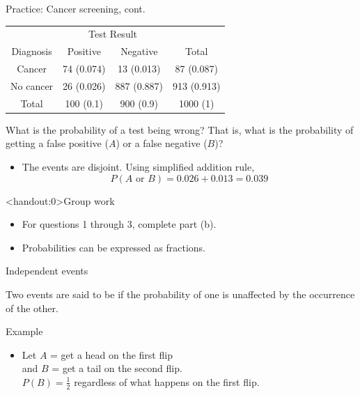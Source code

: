 \documentclass[xcolor=table, handout]{beamer}
\begin{document}
\begin{frame}{Practice: Cancer screening, cont.}
\begin{block}{}
{\centering
\begin{tabular}{c | c  c | c}
\multicolumn{1}{c}{} & \multicolumn{2}{c}{Test Result}\\
Diagnosis & Positive & Negative & Total \\
\hline
Cancer & 74 (0.074) & 13 (0.013) & 87 (0.087)\\
No cancer & 26 (0.026) & 887 (0.887) & 913 (0.913)\\
\hline
Total & 100 (0.1) & 900 (0.9) & 1000 (1)
\end{tabular}\par
}
\end{block}

\begin{exampleblock}{}
What is the probability of a test being wrong? That is, what is the probability of getting a false positive ($A$) or a false negative ($B$)?

\begin{itemize}
\pause
\item The events are disjoint. Using simplified addition rule,
\[ P(A \text{ or } B) = 0.026 + 0.013 = 0.039\]
\end{itemize}
\end{exampleblock}
\end{frame}

\begin{frame}<handout:0>{Group work}
\begin{block}{}
\large
\begin{itemize}
\item For questions 1 through 3, complete part (b).
\item Probabilities can be expressed as fractions.
\end{itemize}
\end{block}
\end{frame}


\begin{frame}{Independent events}
\begin{block}{}
\large Two events are said to be  if the probability of one is unaffected by the occurrence of the other.
\end{block}

\pause

\begin{exampleblock}{Example}
\begin{itemize}
\item Let $A$ = get a head on the first flip\\
and $B$ = get a tail on the second flip.\\
$P(B) = \frac 1 2$ regardless of what happens on the first flip.
\end{itemize}
\end{exampleblock}
\end{frame}
\end{document}
